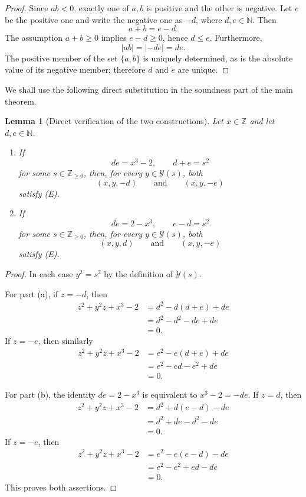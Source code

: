 \documentclass[11pt,a4paper]{article}
\newtheorem{lemma}[theorem]{Lemma}
\theoremstyle{definition}
\theoremstyle{remark}
\newcommand{\Z}{\mathbb Z}
\newcommand{\N}{\mathbb N}
\newcommand{\Yset}{\mathcal Y}
\newcommand{\eqE}{\textup{(E)}}
\begin{document}
\begin{proof}
Since $ab<0$, exactly one of $a,b$ is positive and the other is negative.
Let $e$ be the positive one and write the negative one as $-d$, where
$d,e\in\N$.  Then
\[
 a+b=e-d.
\]
The assumption $a+b\geq0$ implies $e-d\geq0$, hence $d\leq e$.
Furthermore,
\[
 |ab|=|-de|=de.
\]
The positive member of the set $\{a,b\}$ is uniquely determined, as is the
absolute value of its negative member; therefore $d$ and $e$ are unique.
\end{proof}

We shall use the following direct substitution in the soundness part of the
main theorem.

\begin{lemma}[Direct verification of the two constructions]
\label{lem:direct-verification}
Let $x\in\Z$ and let $d,e\in\N$.

\begin{enumerate}[label=\textup{(\alph*)}]
\item If
\[
 de=x^3-2,
 \qquad
 d+e=s^2
\]
for some $s\in\Z_{\geq0}$, then, for every $y\in\Yset(s)$, both
\[
 (x,y,-d)
 \qquad\text{and}\qquad
 (x,y,-e)
\]
satisfy \eqE.

\item If
\[
 de=2-x^3,
 \qquad
 e-d=s^2
\]
for some $s\in\Z_{\geq0}$, then, for every $y\in\Yset(s)$, both
\[
 (x,y,d)
 \qquad\text{and}\qquad
 (x,y,-e)
\]
satisfy \eqE.
\end{enumerate}
\end{lemma}

\begin{proof}
In each case $y^2=s^2$ by the definition of $\Yset(s)$.

For part (a), if $z=-d$, then
\begin{align*}
 z^2+y^2z+x^3-2
 &=d^2-d(d+e)+de\\
 &=d^2-d^2-de+de\\
 &=0.
\end{align*}
If $z=-e$, then similarly
\begin{align*}
 z^2+y^2z+x^3-2
 &=e^2-e(d+e)+de\\
 &=e^2-ed-e^2+de\\
 &=0.
\end{align*}

For part (b), the identity $de=2-x^3$ is equivalent to
$x^3-2=-de$.  If $z=d$, then
\begin{align*}
 z^2+y^2z+x^3-2
 &=d^2+d(e-d)-de\\
 &=d^2+de-d^2-de\\
 &=0.
\end{align*}
If $z=-e$, then
\begin{align*}
 z^2+y^2z+x^3-2
 &=e^2-e(e-d)-de\\
 &=e^2-e^2+ed-de\\
 &=0.
\end{align*}
This proves both assertions.
\end{proof}
\end{document}
